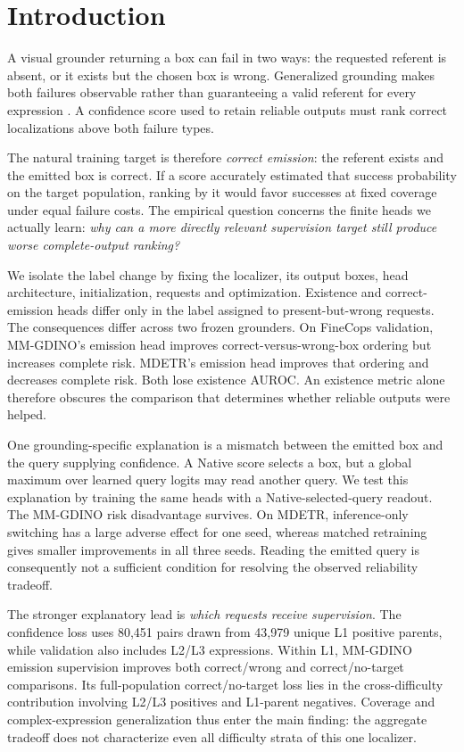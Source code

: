 \documentclass[10pt,twocolumn,letterpaper]{article}
\begin{document}
\section{Introduction}
A visual grounder returning a box can fail in two ways: the requested
referent is absent, or it exists but the chosen box is wrong. Generalized
grounding makes both failures observable rather than guaranteeing a valid
referent for every expression \cite{he2023grec,liu2023gres,liu2024finecops}.
A confidence score used to retain reliable outputs must rank correct
localizations above both failure types.

The natural training target is therefore \emph{correct emission}: the
referent exists and the emitted box is correct. If a score accurately
estimated that success probability on the target population, ranking by
it would favor successes at fixed coverage under equal failure costs.
The empirical question concerns the finite heads we actually learn:
\emph{why can a more directly relevant supervision target still produce
worse complete-output ranking?}

We isolate the label change by fixing the localizer, its output boxes,
head architecture, initialization, requests and optimization. Existence
and correct-emission heads differ only in the label assigned to
present-but-wrong requests. The consequences differ across two frozen
grounders. On FineCops validation, MM-GDINO's emission head improves
correct-versus-wrong-box ordering but increases complete risk. MDETR's
emission head improves that ordering and decreases complete risk. Both
lose existence AUROC. An existence metric alone therefore obscures the
comparison that determines whether reliable outputs were helped.

One grounding-specific explanation is a mismatch between the emitted box
and the query supplying confidence. A Native score selects a box, but a
global maximum over learned query logits may read another query. We test
this explanation by training the same heads with a Native-selected-query
readout. The MM-GDINO risk disadvantage survives. On MDETR,
inference-only switching has a large adverse effect for one seed, whereas
matched retraining gives smaller improvements in all three seeds. Reading the emitted query is consequently not a
sufficient condition for resolving the observed reliability tradeoff.

The stronger explanatory lead is \emph{which requests receive supervision}.
The confidence loss uses 80,451 pairs drawn from 43,979 unique L1 positive
parents, while validation also includes L2/L3 expressions. Within L1,
MM-GDINO emission supervision improves both correct/wrong and correct/no-target
comparisons. Its full-population correct/no-target loss lies in the
cross-difficulty contribution involving L2/L3 positives and L1-parent
negatives. Coverage and complex-expression generalization thus enter the
main finding: the aggregate tradeoff does not characterize even all
difficulty strata of this one localizer.
\end{document}
